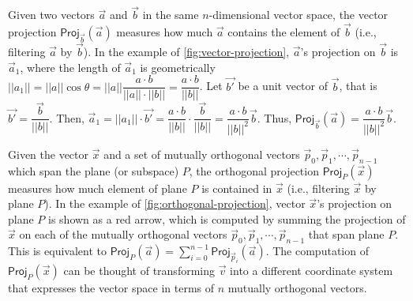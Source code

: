 \begin{figure}[!h]
    \centering
  \caption{}
\end{figure}


 Given two vectors $\vec{a}$ and $\vec{b}$ in the same $n$-dimensional vector space, the vector projection $\textsf{Proj}_{\vec{b}}(\vec{a})$ measures how much $\vec{a}$ contains the element of $\vec{b}$ (i.e., filtering $\vec{a}$ by $\vec{b}$). In the example of \autoref{fig:vector-projection}, $\vec{a}$'s projection on $\vec{b}$ is $\vec{a}_1$, where the length of $\vec{a}_1$ is geometrically $||a_1|| = ||a|| \cos \theta = ||a||\dfrac{a \cdot b}{||a||\cdot||b||} = \dfrac{a \cdot b}{||b||}$. Let $\vec{b'}$ be a unit vector of $\vec{b}$, that is $\vec{b'} = \dfrac{\vec{b}}{||b||}$. Then, $\vec{a}_1 = ||a_1||\cdot\vec{b'} = \dfrac{a \cdot b}{||b||} \cdot \dfrac{\vec{b}}{||b||} = \dfrac{a \cdot b}{||b||^2}\vec{b}$. Thus, $\textsf{Proj}_{\vec{b}}(\vec{a}) = \dfrac{a \cdot b}{||b||^2}\vec{b}$.

 Given the vector $\vec{x}$ and a set of mutually orthogonal vectors $\vec{p}_0, \vec{p}_1, \cdots, \vec{p}_{n-1}$ which span the plane (or subspace) $P$, the orthogonal projection $\textsf{Proj}_P(\vec{x})$ measures how much element of plane $P$ is contained in $\vec{x}$ (i.e., filtering $\vec{x}$ by plane $P$). In the example of \autoref{fig:orthogonal-projection}, vector $\vec{x}$'s projection on plane $P$ is shown as a red arrow, which is computed by summing the projection of $\vec{x}$ on each of the mutually orthogonal vectors $\vec{p}_0, \vec{p}_1, \cdots, \vec{p}_{n-1}$ that span plane $P$. This is equivalent to $\textsf{Proj}_P(\vec{a}) = \sum\limits_{i=0}^{n-1} \textsf{Proj}_{\vec{p}_i}(\vec{a})$. The computation of $\textsf{Proj}_P(\vec{x})$ can be thought of transforming $\vec{v}$ into a different coordinate system that expresses the vector space in terms of $n$ mutually orthogonal vectors. 

